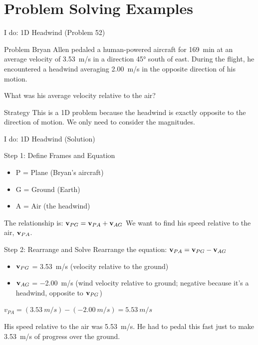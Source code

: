 \documentclass{beamer}
\begin{document}
\section{Problem Solving Examples}

\begin{frame}{I do: 1D Headwind (Problem 52)}
    \begin{block}{Problem}
        Bryan Allen pedaled a human-powered aircraft for \SI{169}{min} at an average velocity of \SI{3.53}{m/s} in a direction \ang{45} south of east. During the flight, he encountered a headwind averaging \SI{2.00}{m/s} in the opposite direction of his motion.
        
        What was his average velocity relative to the air?
    \end{block}
    \begin{block}{Strategy}
        This is a 1D problem because the headwind is exactly opposite to the direction of motion. We only need to consider the magnitudes.
    \end{block}
\end{frame}

\begin{frame}{I do: 1D Headwind (Solution)}
    \begin{block}{Step 1: Define Frames and Equation}
        \begin{itemize}
            \item P = Plane (Bryan's aircraft)
            \item G = Ground (Earth)
            \item A = Air (the headwind)
        \end{itemize}
        The relationship is: $\vb{v}_{PG} = \vb{v}_{PA} + \vb{v}_{AG}$
        We want to find his speed relative to the air, $\vb{v}_{PA}$.
    \end{block}
    
    \begin{block}{Step 2: Rearrange and Solve}
        Rearrange the equation: $\vb{v}_{PA} = \vb{v}_{PG} - \vb{v}_{AG}$
        
        \begin{itemize}
            \item $\vb{v}_{PG}$ = \SI{3.53}{m/s} (velocity relative to the ground)
            \item $\vb{v}_{AG}$ = \SI{-2.00}{m/s} (wind velocity relative to ground; negative because it's a headwind, opposite to $\vb{v}_{PG}$)
        \end{itemize}
        
        $v_{PA} = (\SI{3.53}{m/s}) - (\SI{-2.00}{m/s}) = \SI{5.53}{m/s}$
        
        His speed relative to the air was \SI{5.53}{m/s}. He had to pedal this fast just to make \SI{3.53}{m/s} of progress over the ground.
    \end{block}
\end{frame}
\end{document}
